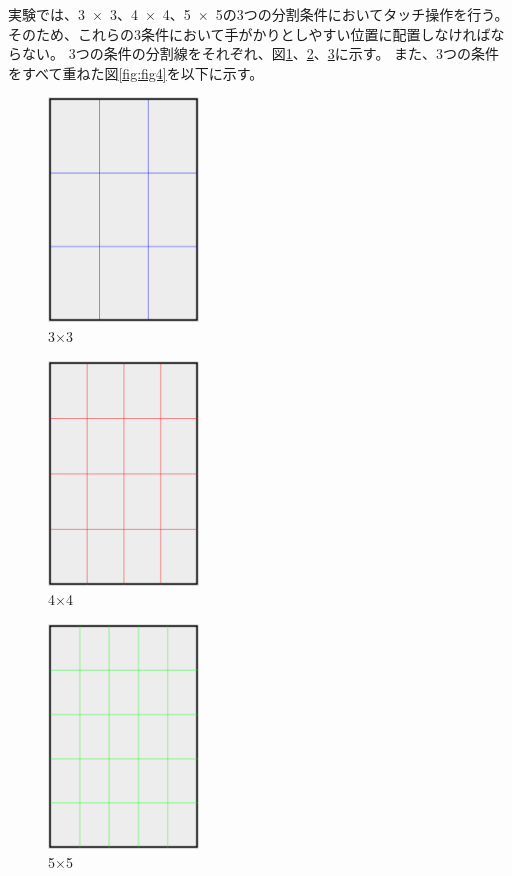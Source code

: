 \documentclass[11pt,a4paper]{jarticle}
\begin{document}
実験では、3~$\times$~3、4~$\times$~4、5~$\times$~5の3つの分割条件においてタッチ操作を行う。
そのため、これらの3条件において手がかりとしやすい位置に配置しなければならない。
3つの条件の分割線をそれぞれ、図\ref{fig:fig1}、\ref{fig:fig2}、\ref{fig:fig3}に示す。
また、3つの条件をすべて重ねた図\ref{fig:fig4}を以下に示す。

\begin{figure}[H]
  \begin{center}
  \includegraphics[width=4cm]{fig/photo1.eps}
  \caption{3×3}
  \label{fig:fig1}
  \end{center}
\end{figure}

\begin{figure}[H]
  \begin{center}
  \includegraphics[width=4cm]{fig/photo2.eps}
  \caption{4×4}
  \label{fig:fig2}
  \end{center}
\end{figure}

\begin{figure}[H]
  \begin{center}
  \includegraphics[width=4cm]{fig/photo3.eps}
  \caption{5×5}
  \label{fig:fig3}
  \end{center}
\end{figure}
\end{document}
